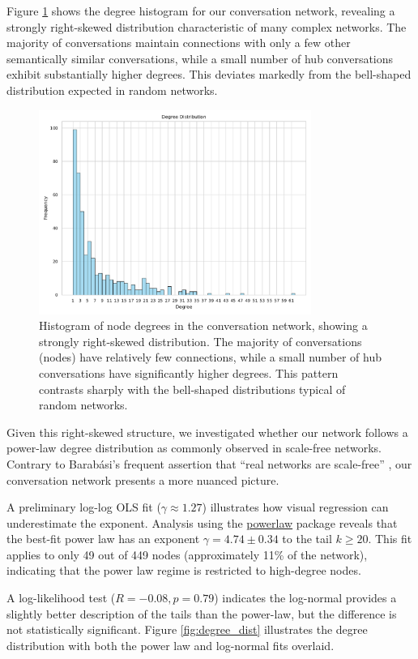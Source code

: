 \documentclass[10pt, a4paper]{article}
\begin{document}
Figure \ref{fig:degree_hist} shows the degree histogram for our conversation network, revealing a strongly right-skewed distribution characteristic of many complex networks. The majority of conversations maintain connections with only a few other semantically similar conversations, while a small number of hub conversations exhibit substantially higher degrees. This deviates markedly from the bell-shaped distribution expected in random networks.

\begin{figure}
\centering
\includegraphics[width=3.5in]{./images/degree_distribution_histogram.pdf}
\caption{Histogram of node degrees in the conversation network, showing a strongly right-skewed distribution. The majority of conversations (nodes) have relatively few connections, while a small number of hub conversations have significantly higher degrees. This pattern contrasts sharply with the bell-shaped distributions typical of random networks.}
\label{fig:degree_hist}
\end{figure}

Given this right-skewed structure, we investigated whether our network follows a power-law degree distribution as commonly observed in scale-free networks. Contrary to Barabási's frequent assertion that ``real networks are scale-free'' \cite{barabasi2009}, our conversation network presents a more nuanced picture.

A preliminary log-log OLS fit ($\gamma \approx 1.27$) illustrates how visual regression can underestimate the exponent. Analysis using the \url{powerlaw} package \cite{alstott2014} reveals that the best-fit power law has an exponent $\gamma = 4.74 \pm 0.34$ to the tail $k \geq 20$. This fit applies to only 49 out of 449 nodes (approximately 11\% of the network), indicating that the power law regime is restricted to high-degree nodes.

A log-likelihood test ($R=-0.08, p= 0.79$) indicates the log-normal provides a slightly better description of the tails than the power-law, but the difference is not statistically significant. Figure \ref{fig:degree_dist} illustrates the degree distribution with both the power law and log-normal fits overlaid.
\end{document}
